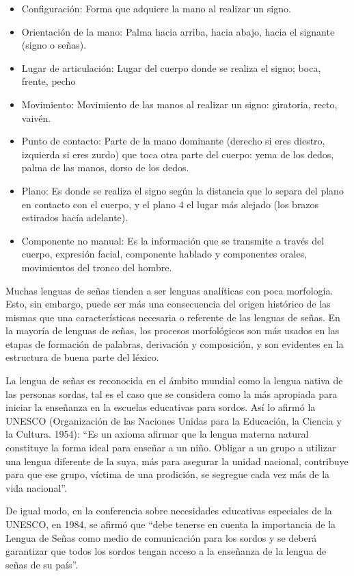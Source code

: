 \documentclass[12pt]{report}%
\begin{document}
\begin{itemize}
\item Configuración: Forma que adquiere la mano al realizar un signo.
\item Orientación de la mano: Palma hacia arriba, hacia abajo, hacia el signante (signo o señas).
\item Lugar de articulación: Lugar del cuerpo donde se realiza el signo; boca, frente, pecho
\item Movimiento: Movimiento de las manos al realizar un signo: giratoria, recto, vaivén.
\item Punto de contacto: Parte de la mano dominante (derecho si eres diestro, izquierda si eres zurdo) que toca otra parte del cuerpo: yema de los dedos, palma de las manos, dorso de los dedos.
\item Plano: Es donde se realiza el signo según la distancia que lo separa del plano en contacto con el cuerpo, y el plano 4 el lugar más alejado (los brazos estirados hacía adelante).
\item Componente no manual: Es la información que se transmite a través del cuerpo, expresión facial, componente hablado y componentes orales, movimientos del tronco del hombre.
\end{itemize}

Muchas lenguas de señas tienden a ser lenguas analíticas con poca morfología. Esto, sin embargo, puede ser más una consecuencia del origen histórico de las mismas que una características necesaria o referente de las lenguas de señas. En la mayoría de lenguas de señas, los procesos morfológicos son más usados en las etapas de formación de palabras, derivación y composición, y son evidentes en la estructura de buena parte del léxico.

La lengua de señas es reconocida en el ámbito mundial como la lengua nativa de las personas sordas, tal es el caso que se considera como la más apropiada para iniciar la enseñanza en la escuelas educativas para sordos. Así lo afirmó la UNESCO (Organización de las Naciones Unidas para la Educación, la Ciencia y la Cultura. 1954): “Es un axioma afirmar que la lengua materna natural constituye la forma ideal para enseñar a un niño. Obligar a un grupo a utilizar una lengua diferente de la suya, más para asegurar la unidad nacional, contribuye para que ese grupo, víctima de una prodición, se segregue cada vez más de la vida nacional”.

De igual modo, en la conferencia sobre necesidades educativas especiales de la UNESCO, en 1984, se afirmó que “debe tenerse en cuenta la importancia de la Lengua de Señas como medio de comunicación para los sordos y se deberá garantizar que todos los sordos tengan acceso a la enseñanza de la lengua de señas de su país”.
\end{document}
